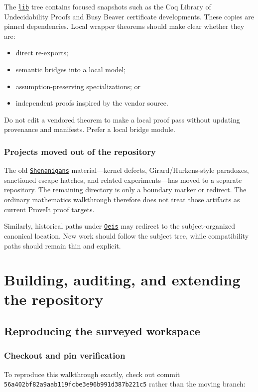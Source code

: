 \documentclass[
  10pt,
  a4paper,
  twoside,
  open=any,
  parskip=half,
  headings=big
]{scrreprt}
\newcommand{\CommitFull}{56a402bf82a9aab119fcbe3e96b991d387b221c5}
\newcommand{\RepoWeb}{https://github.com/VladimirReshetnikov/ProveIt}
\newcommand{\RepoTreeBase}{\RepoWeb/tree/\CommitFull}
\newcommand{\code}[1]{\texttt{\detokenize{#1}}}
\newcommand{\RepoDir}[1]{\href{\RepoTreeBase/#1}{\nolinkurl{#1}}}
\begin{document}
The \RepoDir{lib} tree contains focused snapshots such as the Coq Library of Undecidability Proofs and Busy Beaver certificate developments. These copies are pinned dependencies. Local wrapper theorems should make clear whether they are:

\begin{itemize}
  \item direct re-exports;
  \item semantic bridges into a local model;
  \item assumption-preserving specializations; or
  \item independent proofs inspired by the vendor source.
\end{itemize}

Do not edit a vendored theorem to make a local proof pass without updating provenance and manifests. Prefer a local bridge module.

\section{Projects moved out of the repository}

The old \RepoDir{Shenanigans} material---kernel defects, Girard/Hurkens-style paradoxes, sanctioned escape hatches, and related experiments---has moved to a separate repository. The remaining directory is only a boundary marker or redirect. The ordinary mathematics walkthrough therefore does not treat those artifacts as current ProveIt proof targets.

Similarly, historical paths under \RepoDir{Oeis} may redirect to the subject-organized canonical location. New work should follow the subject tree, while compatibility paths should remain thin and explicit.

\part{Building, auditing, and extending the repository}

\chapter{Reproducing the surveyed workspace}
\label{ch:reproduce}

\section{Checkout and pin verification}

To reproduce this walkthrough exactly, check out commit \texttt{\CommitFull} rather than the moving \code{main} branch:
\end{document}

